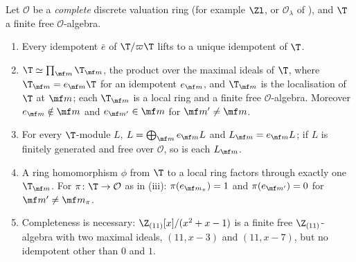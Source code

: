 \begin{theorem}[idempotent lifting and the decomposition $\T=\prod\T_{\mf m}$]\label{thm:modules:idempotent-lifting}
Let $\mathcal O$ be a \emph{complete} discrete valuation ring (for example $\Zl$, or $\mathcal O_\lambda$ of ), and $\T$ a finite free $\mathcal O$-algebra.
\begin{enumerate}[label=(\roman*)]
\item Every idempotent $\bar e$ of $\T/\varpi\T$ lifts to a unique idempotent of $\T$.
\item $\T\simeq\prod_{\mf m}\T_{\mf m}$, the product over the maximal ideals of $\T$, where $\T_{\mf m}=e_{\mf m}\T$ for an idempotent $e_{\mf m}$, and $\T_{\mf m}$ is the
localisation of $\T$ at $\mf m$; each $\T_{\mf m}$ is a local ring and a finite free $\mathcal O$-algebra. Moreover $e_{\mf m}\notin\mf m$ and $e_{\mf m'}\in\mf m$ for $\mf m'\ne\mf m$.
\item For every $\T$-module $L$, $L=\bigoplus_{\mf m}e_{\mf m}L$ and $L_{\mf m}=e_{\mf m}L$; if $L$ is finitely generated and free over $\mathcal O$, so is each $L_{\mf m}$.
\item A ring homomorphism $\phi$ from $\T$ to a local ring factors through exactly one $\T_{\mf m}$. For $\pi\colon\T\to\mathcal O$ as in
(iii): $\pi(e_{\mf m_\pi})=1$ and $\pi(e_{\mf m'})=0$ for $\mf m'\ne\mf m_\pi$.
\item Completeness is necessary: $\Z_{(11)}[x]/(x^2+x-1)$ is a finite free $\Z_{(11)}$-algebra with two maximal ideals, $(11,x-3)$ and $(11,x-7)$, but no
idempotent other than $0$ and $1$.
\end{enumerate}
\end{theorem}

